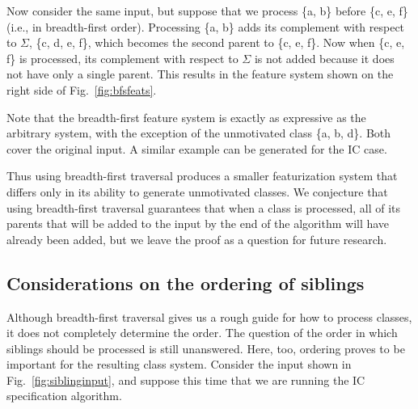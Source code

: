 \documentclass[12pt, oneside]{article}   	%
\begin{document}

Now consider the same input, but suppose that we process \{a, b\} before \{c, e, f\} (i.e., in breadth-first order). Processing \{a, b\} adds its complement with respect to $\Sigma$, \{c, d, e, f\}, which becomes the second parent to \{c, e, f\}. Now when \{c, e, f\} is processed, its complement with respect to $\Sigma$ is not added because it does not have only a single parent. This results in the feature system shown on the right side of Fig.~\ref{fig:bfsfeats}.


Note that the breadth-first feature system is exactly as expressive as the arbitrary system, with the exception of the unmotivated class \{a, b, d\}. Both cover the original input. A similar example can be generated for the IC case.

Thus using breadth-first traversal produces a smaller featurization system that differs only in its ability to generate unmotivated classes. We conjecture that using breadth-first traversal guarantees that when a class is processed, all of its parents that will be added to the input by the end of the algorithm will have already been added, but we leave the proof as a question for future research.

\subsection{Considerations on the ordering of siblings}
\label{app:siblings}

Although breadth-first traversal gives us a rough guide for how to process classes, it does not completely determine the order. The question of the order in which siblings should be processed is still unanswered. Here, too, ordering proves to be important for the resulting class system. Consider the input shown in Fig.~\ref{fig:siblinginput}, and suppose this time that we are running the IC specification algorithm.
\end{document}
